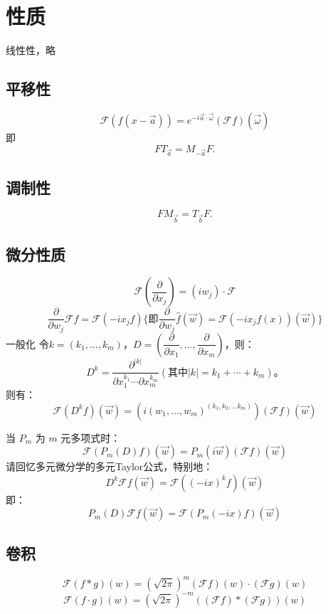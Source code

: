 \documentclass[linespread=1.5,openany]{book}%
\theoremstyle{plain}
\begin{document}
{{{					\section{性质}
					线性性，略
					\subsection{平移性}
					\begin{equation}
						\mathcal{F}(f(x - \vec{a})) = e^{-i \vec{a} \cdot \vec{\omega}} (\mathcal{F}f)(\vec{\omega})
					\end{equation}
					即
					\begin{equation}
						F T_{\vec{a}} = M_{-\vec{a}} F.
					\end{equation}
					
					\subsection{调制性}
					\begin{equation}
						F M_{\vec{b}} = T_{\vec{b}} F.
					\end{equation}
					
					\subsection{微分性质}
					\[\mathcal{F}\left(\dfrac{\partial}{\partial x_j}  \right) = (i w_j) \cdot \mathcal{F} \]
					\[\dfrac{\partial}{\partial w_j} \mathcal{F}f = \mathcal{F}\left(-i x_j f\right)\{\textbf{即}	\dfrac{\partial}{\partial w_j} \hat{f}(\vec{w}) = \mathcal{F}\left(-i x_j f(x)\right)(\vec{w})\}\]
					一般化
					令\(k = (k_1, \dots, k_m)\)，\(D = \left(\dfrac{\partial}{\partial x_1}, \dots, \dfrac{\partial}{\partial x_m}\right)\)，则：
					\[D^{k} = \dfrac{\partial^{|k|}}{\partial x_1^{k_1} \cdots \partial x_m^{k_m}}(\textbf{其中} |k| = k_1 + \cdots + k_m )。
					\]
					则有：
					\[\mathcal{F}(D^{k} f)(\vec{w}) = \left(i (w_1, \dots, w_m)^{(k_1,k_2,...k_m)}\right) (\mathcal{F}f)(\vec{w})\]
					
					当 \(P_m\) 为 \(m\) 元多项式时：
					\[\mathcal{F}(P_m(D) f)(\vec{w}) = P_m(i \vec{w}) (\mathcal{F}f)(\vec{w})\]
					请回忆多元微分学的多元Taylor公式，特别地：
					\[D^{k} \mathcal{F}f(\vec{w}) = \mathcal{F}((-i x)^{k} f)(\vec{w})\]
					即：\[P_m(D) \mathcal{F}f(\vec{w}) = \mathcal{F}(P_m(-i x) f)(\vec{w})\]
					\subsection{卷积}
					\[
					\mathcal{F}(f * g)(w) = (\sqrt{2\pi})^m (\mathcal{F}f)(w) \cdot(\mathcal{F}g)(w)
					\]\[
					\mathcal{F}(f \cdot g)(w) = (\sqrt{2\pi})^{-m} \left( (\mathcal{F}f) * (\mathcal{F}g) \right)(w)
					\]
}}}
\end{document}
